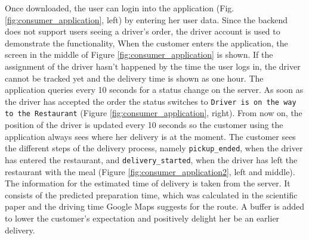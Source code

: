 Once downloaded, the user can login into the application (Fig. \ref{fig:consumer_application}, left) by entering her user data. Since the backend does not support users seeing a driver's order, the driver account is used to demonstrate the functionality, \newline
When the customer enters the application, the screen in the middle of Figure \ref{fig:consumer_application} is shown. If the assignment of the driver hasn't happened by the time the user logs in, the driver cannot be tracked yet and the delivery time is shown as one hour.\newline
The application queries every 10 seconds for a status change on the server. As soon as the driver has accepted the order the status switches to \texttt{Driver is on the way to the Restaurant} (Figure \ref{fig:consumer_application}, right). From now on, the position of the driver is updated every 10 seconds so the customer using the application always sees where her delivery is at the moment. The customer sees the different steps of the delivery process, namely \texttt{pickup\_ended}, when the driver has entered the restaurant, and \texttt{delivery\_started}, when the driver has left the restaurant with the meal (Figure \ref{fig:consumer_application2}, left and middle). The information for the estimated time of delivery is taken from the server. It consists of the predicted preparation time, which was calculated in the scientific paper and the driving time Google Maps suggests for the route. A buffer is added to lower the customer's expectation and positively delight her be an earlier delivery.



